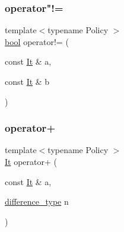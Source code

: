 \subsubsection{\texorpdfstring{operator"!=}{operator!=}}
{\footnotesize\ttfamily template$<$typename Policy $>$ \\
\mbox{\hyperlink{asdl_8h_af6a258d8f3ee5206d682d799316314b1}{bool}} operator!= (\begin{DoxyParamCaption}\item[{const \mbox{\hyperlink{classgeneric__iterator}{It}} \&}]{a,  }\item[{const \mbox{\hyperlink{classgeneric__iterator}{It}} \&}]{b }\end{DoxyParamCaption})\hspace{0.3cm}{\ttfamily [friend]}}

\mbox{\label{classgeneric__iterator_a33b5fcd097d1dcc87426b4f085094d30}} 
\subsubsection{\texorpdfstring{operator+}{operator+}\hspace{0.1cm}{\footnotesize\ttfamily [1/2]}}
{\footnotesize\ttfamily template$<$typename Policy $>$ \\
\mbox{\hyperlink{classgeneric__iterator}{It}} operator+ (\begin{DoxyParamCaption}\item[{const \mbox{\hyperlink{classgeneric__iterator}{It}} \&}]{a,  }\item[{\mbox{\hyperlink{classgeneric__iterator_a307cd6eddc16127eb873d76bcfc07233}{difference\+\_\+type}}}]{n }\end{DoxyParamCaption})\hspace{0.3cm}{\ttfamily [friend]}}

\mbox{\label{classgeneric__iterator_a7f7c67731fffe592d503faa2ac6929e9}} 
